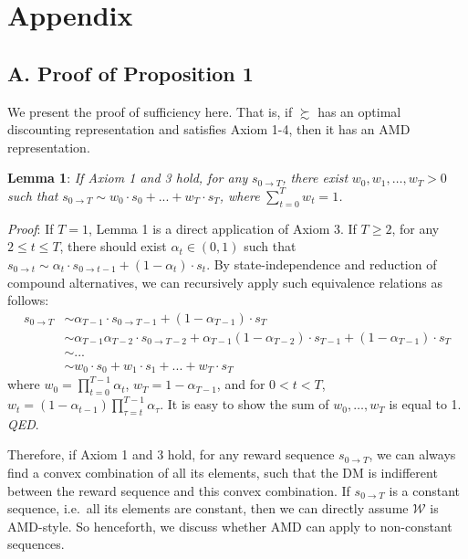 \newpage

\hypertarget{appendix}{%
\section*{Appendix}\label{appendix}}

\hypertarget{a.-proof-of-proposition-1}{%
\subsection*{A. Proof of Proposition
1}\label{a.-proof-of-proposition-1}}

We present the proof of sufficiency here. That is, if \(\succsim\) has
an optimal discounting representation and satisfies Axiom 1-4, then it
has an AMD representation.

\noindent \textbf{Lemma 1}: \emph{If Axiom 1 and 3 hold, for any}
\(s_{0\rightarrow T}\)\emph{, there exist} \(w_0, w_1, …, w_T > 0\)
\emph{such that}
\(s_{0\rightarrow T} \sim w_0 \cdot s_0 + ...+w_T\cdot s_T\)\emph{,
where} \(\sum_{t=0}^T w_t=1\)\emph{.}

\noindent \emph{Proof}: If \(T=1\), Lemma 1 is a direct application of
Axiom 3. If \(T\geq 2\), for any \(2\leq t\leq T\), there should exist
\(\alpha_t\in(0,1)\) such that
\(s_{0\rightarrow t}\sim \alpha_t\cdot s_{0\rightarrow t-1}+(1-\alpha_t)\cdot s_{t}\).
By state-independence and reduction of compound alternatives, we can
recursively apply such equivalence relations as follows:\[
\begin{aligned}
s_{0\rightarrow T} &\sim \alpha_{T-1}\cdot s_{0\rightarrow T-1} + (1-\alpha_{T-1})\cdot s_T \\
&\sim  \alpha_{T-1}\alpha_{T-2}\cdot s_{0\rightarrow T-2} + \alpha_{T-1}(1-\alpha_{T-2})\cdot s_{T-1} + (1-\alpha_{T-1})\cdot s_T \\
& \sim ...\\
& \sim w_0 \cdot s_0 + w_1\cdot s_1 +... +w_T\cdot s_T
\end{aligned}
\]where \(w_0=\prod_{t=0}^{T-1}\alpha_t\), \(w_T = 1-\alpha_{T-1}\), and
for \(0<t<T\),
\(w_t=(1-\alpha_{t-1})\prod_{\tau=t}^{T-1}\alpha_{\tau}\). It is easy to
show the sum of \(w_0,…,w_T\) is equal to 1. \emph{QED}.

Therefore, if Axiom 1 and 3 hold, for any reward sequence
\(s_{0\rightarrow T}\), we can always find a convex combination of all
its elements, such that the DM is indifferent between the reward
sequence and this convex combination. If \(s_{0\rightarrow T}\) is a
constant sequence, i.e.~all its elements are constant, then we can
directly assume \(\mathcal{W}\) is AMD-style. So henceforth, we discuss
whether AMD can apply to non-constant sequences.

